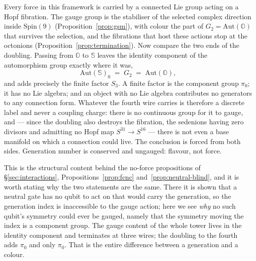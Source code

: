 Every force in this framework is carried by a connected Lie group acting on a Hopf fibration. The
gauge group is the stabiliser of the selected complex direction inside $\mathrm{Spin}(9)$
(Proposition~\ref{prop:gsm}), with colour the part of $G_2 = \mathrm{Aut}(\mathbb{O})$ that survives
the selection, and the fibrations that host these actions stop at the octonions
(Proposition~\ref{prop:termination}). Now compare the two ends of the doubling. Passing from
$\mathbb{O}$ to $\mathbb{S}$ leaves the identity component of the automorphism group exactly where it
was,
\begin{equation}
  \mathrm{Aut}(\mathbb{S})_0 \;=\; G_2 \;=\; \mathrm{Aut}(\mathbb{O}),
  \label{eq:identity-component}
\end{equation}
and adds precisely the finite factor $S_3$. A finite factor is the component group $\pi_0$; it has no
Lie algebra; and an object with no Lie algebra contributes no generators to any connection form.
Whatever the fourth wire carries is therefore a discrete label and never a coupling charge: there is
no continuous group for it to gauge, and --- since the doubling also destroys the fibration, the
sedenions having zero divisors and admitting no Hopf map $S^{31}\to S^{16}$ --- there is not even a
base manifold on which a connection could live. The conclusion is forced from both sides. Generation
number is conserved and ungauged: flavour, not force.

This is the structural content behind the no-force propositions of \S\ref{sec:interactions}, Propositions~\ref{prop:fcnc} and~\ref{prop:neutral-blind},
and it is worth stating why the two statements are the same. There it is shown that a neutral gate
has no qubit to act on that would carry the generation, so the generation index is inaccessible to
the gauge action; here we see \emph{why} no such qubit's symmetry could ever be gauged, namely that
the symmetry moving the index is a component group. The gauge content of the whole tower lives in the
identity component and terminates at three wires; the doubling to the fourth adds $\pi_0$ and only
$\pi_0$. That is the entire difference between a generation and a colour.

